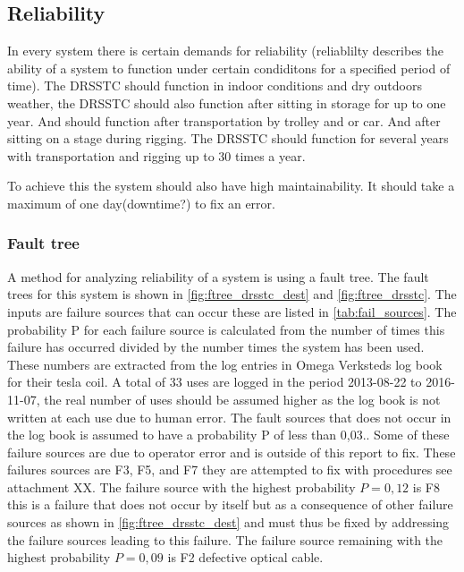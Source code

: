 \subsection{Reliability}
In every system there is certain demands for reliability (reliablilty describes the ability of a system to function under certain condiditons for a specified period of time). The DRSSTC should function in indoor conditions and dry outdoors weather, the DRSSTC should also function after sitting in storage for up to one year. And should function after transportation by trolley and or car. And after sitting on a stage during rigging. The DRSSTC should function for several years with transportation and rigging up to 30 times a year.

To achieve this the system should also have high maintainability. It should take a maximum of one day(downtime?) to fix an error.

\subsubsection{Fault tree}
A method for analyzing reliability of a system is using a fault tree. The fault trees for this system is shown in \cref{fig:ftree_drsstc_dest} and \cref{fig:ftree_drsstc}. The inputs are failure sources that can occur these are listed in \cref{tab:fail_sources}. The probability P for each failure source is calculated from the number of times this failure has occurred divided by the number times the system has been used. These numbers are extracted from the log entries in Omega Verksteds log book for their tesla coil. A total of 33 uses are logged in the period 2013-08-22 to 2016-11-07, the real number of uses should be assumed higher as the log book is not written at each use due to human error. The fault sources that does not occur in the log book is assumed to have a probability P of less than 0,03.. Some of these failure sources are due to operator error and is outside of this report to fix. These failures sources are F3, F5, and F7 they are attempted to fix with procedures see attachment XX. The failure source with the highest probability $P=0,12$ is F8 this is a failure that does not occur by itself but as a consequence of other failure sources as shown in \cref{fig:ftree_drsstc_dest} and must thus be fixed by addressing the failure sources leading to this failure. The failure source remaining with the highest probability $P=0,09$ is F2 defective optical cable.

